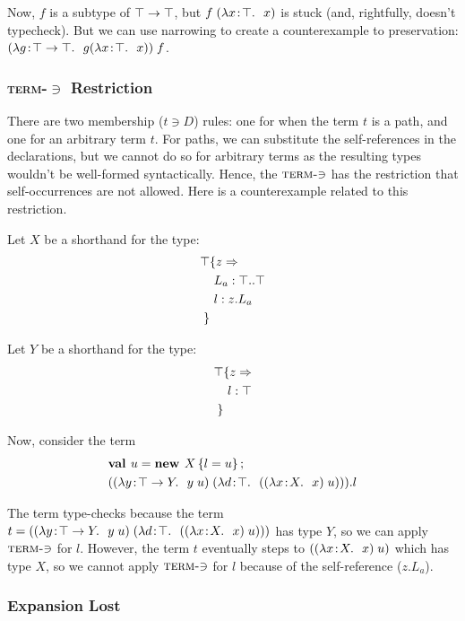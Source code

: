 \documentclass[preprint]{sigplanconf}
\begin{document}
Now, $f$ is a subtype of $\top \rightarrow \top$, but $f\;(\lambda x\!:\!\top.\ \ x)$ is stuck (and, rightfully, doesn't typecheck). But we can use
narrowing to create a counterexample to preservation: $(\lambda g\!:\!\top \rightarrow \top.\ \ g (\lambda x\!:\!\top.\ \ x))\;f$.

\subsubsection{\texorpdfstring{\textsc{term-$\ni$}}{Term-Mem} Restriction}\label{term_mem}

There are two membership ($t \ni D$) rules: one for when the term $t$
is a path, and one for an arbitrary term $t$. For paths, we can
substitute the self-references in the declarations, but we cannot do
so for arbitrary terms as the resulting types wouldn't be well-formed
syntactically. Hence, the $\textsc{term-$\ni$}$ has the restriction
that self-occurrences are not allowed. Here is a counterexample related
to this restriction.

Let $X$ be a shorthand for the type:
\begin{align*}
\top & \{z \Rightarrow \\
&\ L_a : \top..\top\\
&\ l : z.L_a\\
 \}&
\end{align*}

Let $Y$ be a shorthand for the type:
\begin{align*}
\top & \{z \Rightarrow \\
&\ l : \top\\
 \}&
\end{align*}

Now, consider the term
\begin{align*}
&\mlnew u {X \ldefs{ l = u }}{
(\app {(\abs y {\Top \tfun Y} {\app y u})} {(\abs d \Top {(\app {(\abs x X x)} u)})}).l
}
\end{align*}

The term type-checks because the term $t=((\lambda y\!:\!\top \rightarrow Y.\ \ y\;u)\;(\lambda d\!:\!\top.\ \ ((\lambda x\!:\!X.\ \ x)\;u)))$ has type
$Y$, so we can apply $\textsc{term-$\ni$}$ for $l$. However, the term
$t$ eventually steps to $((\lambda x\!:\!X.\ \ x)\;u)$ which has type $X$,
so we cannot apply $\textsc{term-$\ni$}$ for $l$ because of the
self-reference ($z.L_a$).

\subsubsection{Expansion Lost}\label{narrowing_exp}
\end{document}
